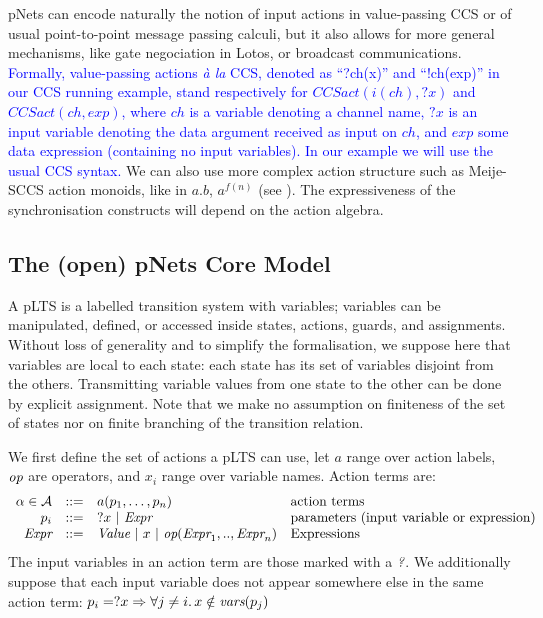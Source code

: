 \documentclass{lncs/llncs}
\newcommand{\ERIC}[1]{\textcolor{blue}{#1}}
\def\AlgA{\mathcal{A}}
\begin{document}
pNets can encode naturally the notion of input actions in value-passing CCS
\cite{Milner89} or of usual point-to-point message passing calculi, but it also allows
for more general mechanisms, like gate negociation in Lotos, or broadcast
communications.
\ERIC{Formally, value-passing actions \emph{\`a la} CCS, denoted as ``?ch(x)'' and ``!ch(exp)'' in our CCS running example, stand respectively for $CCSact(i(ch),?x)$ and $CCSact(ch,exp)$, where $ch$ is a variable denoting a channel name, $?x$ is an input variable denoting the data argument received as input on $ch$, and $exp$ some data expression (containing no input variables). In our example we will use the usual CCS syntax. }
We can also use more complex action structure such as Meije-SCCS action
monoids, like in $a.b$, $a^{f(n)}$ (see \cite{deSimone85}). The expressiveness of the synchronisation constructs
will depend on the action algebra.




\subsection{The (open) pNets Core Model}
\label{section:pNets}


A pLTS is a labelled transition system with variables; variables can be
manipulated, defined, or accessed inside states, actions, guards, and
assignments. Without loss of generality and to simplify the formalisation, we suppose 
here that 
variables are local to each 
state: each state has its set of variables disjoint from the others. Transmitting 
variable values from one state to the other can be done by explicit assignment. 
Note that we make no assumption on finiteness of the set of states nor
on finite branching of the transition relation.

We first define the set of actions a pLTS can use, let $a$
range over action labels, $\symb{op}$ are operators, and $x_i$ range over
variable names. Action terms are:
\[
\begin{array}[l]{rcl@{\quad}p{5.5cm}}
  \alpha\in\AlgA&::=&a(p_1,\ldots,p_n)&\text{action terms}\\
  p_i&::=& ?x~|~\symb{Expr}&\text{parameters (input variable or expression)}\\
  \symb{Expr}&::=& \symb{Value}~|~x~|~\symb{op}(\symb{Expr}_1,..,\symb{Expr}_n)&\text{Expressions}
\end{array}
\]
The input variables in an action term are those marked with a
$\symb{?}$.
We additionally suppose that each input variable does not
appear somewhere else in the same action term:
$p_i=?x\Rightarrow\forall j\neq i.\, x\notin \vars(p_j)$
\end{document}
